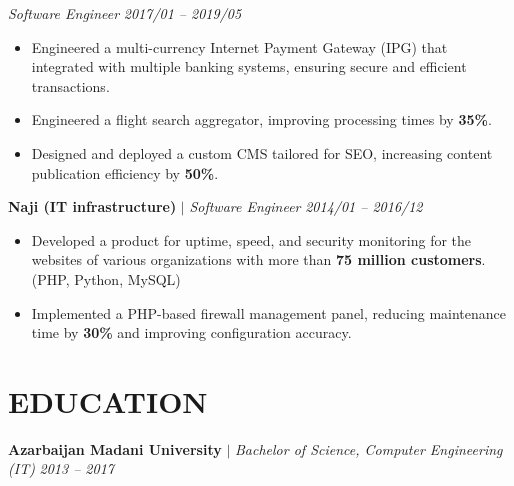 \documentclass[11 pt,a4paper]{article} %
\newcommand{\companynamesize}{\large}         %
\newcommand{\jobtitlesize}{\normalsize}       %
\newcommand{\datesize}{\small}                %
\newcommand{\techstacksize}{\small}           %
\newlength{\itemgap}
\newlength{\jobgap}
\newcommand{\techstack}[1]{\textcolor{techcolor}{\techstacksize #1}}
\begin{document}
\vspace{0.3em} %

{\jobtitlesize \textit{\textcolor{positioncolor}{Software Engineer}}} \hfill {\datesize \textit{\textcolor{companycolor}{2017/01 -- 2019/05}}} %
\begin{itemize}[leftmargin=0.2in, itemsep=\itemgap, topsep=2pt]
    \item Engineered a multi-currency Internet Payment Gateway (IPG) that integrated with multiple banking systems, ensuring secure and efficient transactions. %
    \item Engineered a flight search aggregator, improving processing times by \textbf{35\%}. %
    \item Designed and deployed a custom CMS tailored for SEO, increasing content publication efficiency by \textbf{50\%}. %
\end{itemize}

\vspace{\jobgap} %

{\companynamesize \textbf{\textcolor{companycolor}{Naji (IT infrastructure)}}} $|$ {\jobtitlesize \textit{\textcolor{positioncolor}{Software Engineer}}} \hfill {\datesize \textit{\textcolor{companycolor}{2014/01 -- 2016/12}}} %
\begin{itemize}[leftmargin=0.2in, itemsep=\itemgap, topsep=2pt]
    \item Developed a product for uptime, speed, and security monitoring for the websites of various organizations with more than \textbf{75 million customers}. \techstack{(PHP, Python, MySQL)} %
    \item Implemented a PHP-based firewall management panel, reducing maintenance time by \textbf{30\%} and improving configuration accuracy. %
\end{itemize}

\section*{EDUCATION}
{\companynamesize \textbf{\textcolor{companycolor}{Azarbaijan Madani University}}} $|$ {\jobtitlesize \textit{\textcolor{positioncolor}{Bachelor of Science, Computer Engineering (IT)}}} \hfill {\datesize \textit{\textcolor{companycolor}{2013 -- 2017}}} %
\end{document}
